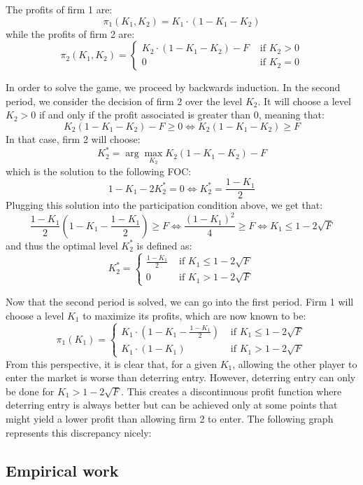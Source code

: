 \documentclass[12pt]{report}
\begin{document}
The profits of firm 1 are: $$\pi_1(K_1, K_2) = K_1\cdot (1 - K_1 - K_2) $$
while the profits of firm 2 are: $$ \pi_2(K_1, K_2) = \begin{cases}
K_2\cdot (1 - K_1 - K_2) - F & \text{ if } K_2 > 0 \\
0 & \text{ if } K_2 = 0
\end{cases} $$

In order to solve the game, we proceed by backwards induction. In the second period, we consider the decision of firm 2 over the level $K_2$. It will choose a level $K_2 > 0$ if and only if the profit associated is greater than 0, meaning that: $$ K_2 (1 - K_1 - K_2) - F \geq 0 \Leftrightarrow K_2 (1 - K_1 - K_2) \geq F $$ In that case, firm 2 will choose: $$K_2^* = \arg\max_{K_2} K_2 (1 - K_1 - K_2) - F $$ which is the solution to the following FOC: $$1 - K_1 - 2K_2^* = 0 \Leftrightarrow K_2^* = \frac{1 - K_1}{2} $$ Plugging this solution into the participation condition above, we get that: $$  \frac{1 - K_1}{2} (1 - K_1 - \frac{1 - K_1}{2}) \geq F \Leftrightarrow \frac{(1 - K_1)^2}{4} \geq F \Leftrightarrow K_1 \leq 1 - 2\sqrt{F} $$
and thus the optimal level $K_2^*$ is defined as: $$ K_2^* = \begin{cases}
\frac{1 - K_1}{2} & \text{ if } K_1 \leq 1 - 2\sqrt{F} \\
0 & \text{ if } K_1 > 1 - 2\sqrt{F}
\end{cases} $$

Now that the second period is solved, we can go into the first period. Firm 1 will choose a level $K_1$ to maximize its profits, which are now known to be: $$\pi_1(K_1) = \begin{cases}
K_1 \cdot \left(1 - K_1 - \frac{1 - K_1}{2}\right) & \text{ if } K_1 \leq 1 - 2\sqrt{F} \\
K_1\cdot (1 - K_1) & \text{ if } K_1 > 1 - 2\sqrt{F}
\end{cases} $$ From this perspective, it is clear that, for a given $K_1$, allowing the other player to enter the market is worse than deterring entry. However, deterring entry can only be done for $K_1 > 1 - 2\sqrt{F}$. This creates a discontinuous profit function where deterring entry is always better but can be achieved only at some points that might yield a lower profit than allowing firm 2 to enter. The following graph represents this discrepancy nicely:



\subsection{Empirical work}

 
\end{document}
